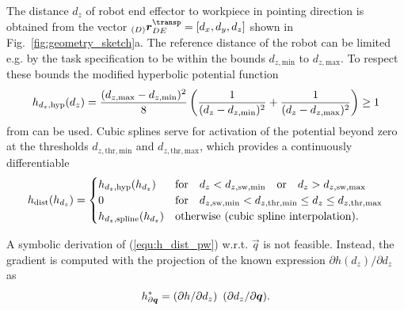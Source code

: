 \documentclass[graybox,vecphys]{svmult}
\newcommand{\ortvek}[4]{{ }_{(#1)}{\boldsymbol{#2}}^{#3}_{#4} }
\begin{document}
The distance $d_z$ of robot end effector to workpiece in pointing direction is obtained from the vector $\ortvek{D}{r}{\transp}{DE} = [d_x,d_y,d_z]$ shown in Fig.~\ref{fig:geometry_sketch}a.
The reference distance of the robot can be limited e.g. by the task specification to be within the bounds $d_{z,\mathrm{min}}$ to $d_{z,\mathrm{max}}$.
To respect these bounds the modified hyperbolic potential function
%
\vspace{-0.1cm}
\begin{equation}
h_{d_z,\mathrm{hyp}}(d_z)
=
\frac{(d_{z,\mathrm{max}}-d_{z,\mathrm{min}})^2}{8}
\left(
\frac{1}{(d_{z}-d_{z,\mathrm{min}})^2}
+
\frac{1}{(d_{z}-d_{z,\mathrm{max}})^2}
\right)
\ge 1
\label{equ:h_dz_hyp}
\vspace{-0.1cm}
\end{equation}
%
from \cite{ZhuQuCaoYan2013}
can be used.
%
Cubic splines serve for activation of the potential beyond zero at the thresholds $d_{z,\mathrm{thr,min}}$ and $d_{z,\mathrm{thr,max}}$, which provides a continuously differentiable
%
\begin{equation}
\vspace{-0.1cm}
h_{\mathrm{dist}}(h_{d_z})
=
\begin{cases} 
h_{d_z,\mathrm{hyp}}(h_{d_z}) & \mathrm{for} \quad d_z < d_{z,\mathrm{sw,min}} \quad  \mathrm{or} \quad d_z > d_{z,\mathrm{sw,max}}\\
0 & \mathrm{for} \quad d_{z,\mathrm{sw,min}} < d_{z,\mathrm{thr,min}} \leq d_z \leq d_{z,\mathrm{thr,max}} \\
h_{d_z,\mathrm{spline}}(h_{d_z}) & \mathrm{otherwise~(cubic~spline~interpolation)}.
\end{cases}
\label{equ:h_dist_pw}
\vspace{-0.0cm}
\end{equation}

A symbolic derivation of (\ref{equ:h_dist_pw}) w.r.t. $\vec{q}$ is not feasible.
Instead, the gradient is computed with the projection of the known expression $\partial h(d_z)/\partial d_z$ as
%
\vspace{-0.1cm}
\begin{equation}
h_{\partial \vec{q}}^{*} 
= 
({\partial h}/{\partial d_z} ) \enspace
({\partial d_z}/{\partial \vec{q}}).
\label{eq:grad_proj_dqdz}
\vspace{-0.1cm}
\end{equation}
\end{document}
